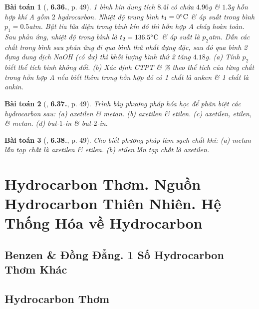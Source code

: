 \documentclass{article}
\numberwithin{equation}{section}
\newtheorem{baitoan}{Bài toán}[section]
\begin{document}
\begin{baitoan}[\cite{SBT_Hoa_Hoc_11_co_ban}, \textbf{6.36.}, p. 49]
	1 bình kín dung tích $8.4$\emph{l} có chứa $4.96$\emph{g } \& $1.3$\emph{g} hỗn hợp khí A gồm $2$ hydrocarbon. Nhiệt độ trung bình $t_1 = 0^\circ{\rm C}$ \& áp suất trong bình $p_1 = 0.5$\emph{atm}. Bật tia lửa điện trong bình kín đó thì hỗn hợp A cháy hoàn toàn. Sau phản ứng, nhiệt độ trong bình là $t_2 = 136.5^\circ{\rm C}$ \& áp suất là $p_2$\emph{atm}. Dẫn các chất trong bình sau phản ứng đi qua bình thứ nhất đựng \emph{} đặc, sau đó qua bình 2 đựng dung dịch \emph{NaOH} (có dư) thì khối lượng bình thứ 2 tăng $4.18$\emph{g}. (a) Tính $p_2$ biết thể tích bình không đổi. (b) Xác định CTPT \& \% theo thể tích của từng chất trong hỗn hợp A nếu biết thêm trong hỗn hợp đó có 1 chất là anken \& 1 chất là ankin.
\end{baitoan}

\begin{baitoan}[\cite{SBT_Hoa_Hoc_11_co_ban}, \textbf{6.37.}, p. 49]
	Trình bày phương pháp hóa học để phân biệt các hydrocarbon sau: (a) axetilen \& metan. (b) axetilen \& etilen. (c) axetilen, etilen, \& metan. (d) but-$1$-in \& but-$2$-in.
\end{baitoan}

\begin{baitoan}[\cite{SBT_Hoa_Hoc_11_co_ban}, \textbf{6.38.}, p. 49]
	Cho biết phương pháp làm sạch chất khí: (a) metan lẫn tạp chất là axetilen \& etilen. (b) etilen lẫn tạp chất là axetilen.
\end{baitoan}


\section{Hydrocarbon Thơm. Nguồn Hydrocarbon Thiên Nhiên. Hệ Thống Hóa về Hydrocarbon}

\subsection{Benzen \& Đồng Đẳng. 1 Số Hydrocarbon Thơm Khác}


\subsection{Hydrocarbon Thơm}
\end{document}
